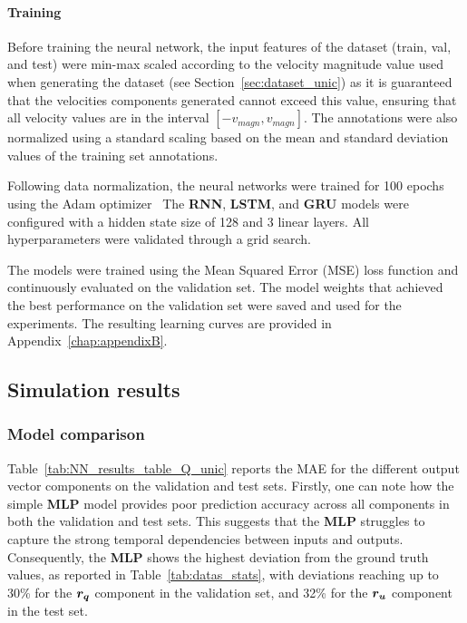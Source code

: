 \paragraph{Training}

Before training the neural network, the input features of the dataset (train, val, and test) were min-max scaled according to the velocity magnitude value used when generating the dataset (see Section~\ref{sec:dataset_unic}) as it is guaranteed that the velocities components generated cannot exceed this value, ensuring that all velocity values are in the interval $[-v_{magn}, v_{magn}]$.  
The annotations were also normalized using a standard scaling based on the mean and standard deviation values of the training set annotations.

Following data normalization, the neural networks were trained for 100 epochs using the Adam optimizer~\cite{kingma2014adam}
The \textbf{RNN}, \textbf{LSTM}, and \textbf{GRU} models were configured with a hidden state size of 128 and 3 linear layers. 
All hyperparameters were validated through a grid search.

The models were trained using the Mean Squared Error (MSE) loss function and continuously evaluated on the validation set. 
The model weights that achieved the best performance on the validation set were saved and used for the experiments. 
The resulting learning curves are provided in Appendix~\ref{chap:appendixB}.

\subsection{Simulation results}

\subsubsection{Model comparison}\label{sec:nn_comparaison_unic}



Table~\ref{tab:NN_results_table_Q_unic} reports the MAE for the different output vector components on the validation and test sets. 
Firstly, one can note how the simple \textbf{MLP} model provides poor prediction accuracy across all components in both the validation and test sets.
This suggests that the \textbf{MLP} struggles to capture the strong temporal dependencies between inputs and outputs.
Consequently, the \textbf{MLP} shows the highest deviation from the ground truth values, as reported in Table~\ref{tab:datas_stats}, with deviations reaching up to 30\% for the $\boldsymbol{r_q}$ component in the validation set, and 32\% for the $\boldsymbol{r_u}$ component in the test set.

